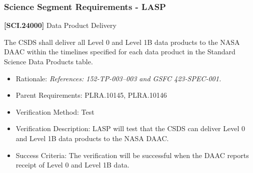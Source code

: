 \subsubsection{Science Segment Requirements - LASP}
\label{sciencesegmentrequirements-lasp}

\textbf{[SCI.24000]} Data Product Delivery

The \gls{CSDS} shall deliver all Level 0 and Level 1B data products to the NASA \gls{DAAC} within the timelines specified for each data product in the Standard Science Data Products table.

\begin{itemize}
\item{} Rationale: \emph{References: 152-TP-003--003 and GSFC 423-SPEC-001.}

\item{} Parent Requirements: PLRA.10145, PLRA.10146

\item{} Verification Method: Test

\item{} Verification Description: \gls{LASP} will \gls{test} that the \gls{CSDS} can deliver Level 0 and Level 1B data products to the NASA \gls{DAAC}.

\item{} Success Criteria: The verification will be successful when the \gls{DAAC} reports receipt of Level 0 and Level 1B data.

\end{itemize}



